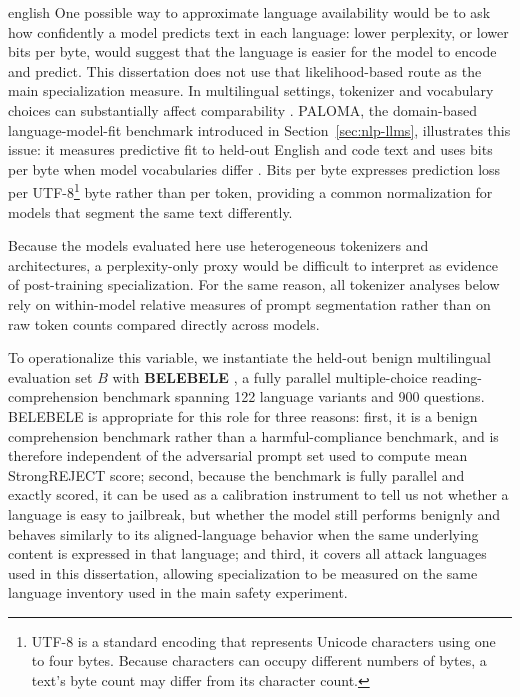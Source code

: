 \begin{otherlanguage*}{english}
One possible way to approximate language availability would be to ask how confidently a model predicts text in each language: lower perplexity, or lower bits per byte, would suggest that the language is easier for the model to encode and predict. This dissertation does not use that likelihood-based route as the main specialization measure. In multilingual settings, tokenizer and vocabulary choices can substantially affect comparability \cite{rust2021tokenizer}. PALOMA, the domain-based language-model-fit benchmark introduced in Section~\ref{sec:nlp-llms}, illustrates this issue: it measures predictive fit to held-out English and code text and uses bits per byte when model vocabularies differ \cite{magnusson2023paloma}. Bits per byte expresses prediction loss per UTF-8\footnote{UTF-8 is a standard encoding that represents Unicode characters using one to four bytes. Because characters can occupy different numbers of bytes, a text's byte count may differ from its character count.} byte rather than per token, providing a common normalization for models that segment the same text differently. 

Because the models evaluated here use heterogeneous tokenizers and architectures, a perplexity-only proxy would be difficult to interpret as evidence of post-training specialization. For the same reason, all tokenizer analyses below rely on within-model relative measures of prompt segmentation rather than on raw token counts compared directly across models.

To operationalize this variable, we instantiate the held-out benign multilingual evaluation set $B$ with \textbf{BELEBELE} \cite{bandarkar-etal-2024-belebele}, a fully parallel multiple-choice reading-comprehension benchmark spanning 122 language variants and 900 questions. BELEBELE is appropriate for this role for three reasons: first, it is a benign comprehension benchmark rather than a harmful-compliance benchmark, and is therefore independent of the adversarial prompt set used to compute mean StrongREJECT score; second, because the benchmark is fully parallel and exactly scored, it can be used as a calibration instrument to tell us not whether a language is easy to jailbreak, but whether the model still performs benignly and behaves similarly to its aligned-language behavior when the same underlying content is expressed in that language; and third, it covers all attack languages used in this dissertation, allowing specialization to be measured on the same language inventory used in the main safety experiment.


\end{otherlanguage*}
